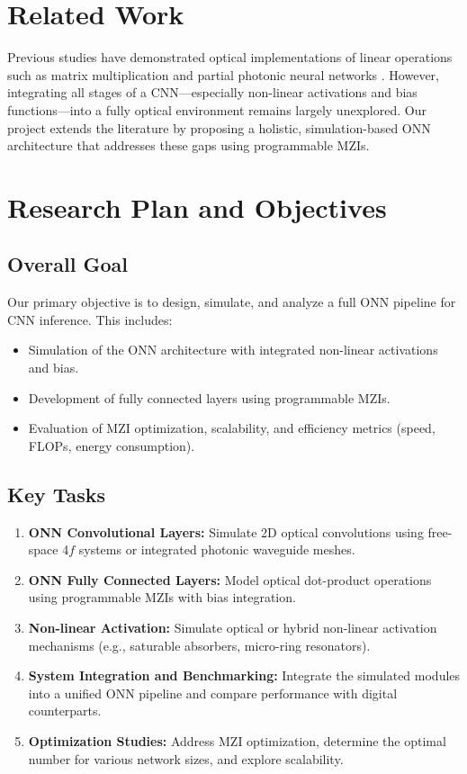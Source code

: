 \documentclass[conference]{IEEEtran}
\begin{document}
\section{Related Work}
Previous studies have demonstrated optical implementations of linear operations such as matrix multiplication \cite{ref:shen2017deep, ref:harris2018linear} and partial photonic neural networks \cite{ref:recent_developments}. However, integrating all stages of a CNN—especially non-linear activations and bias functions—into a fully optical environment remains largely unexplored. Our project extends the literature by proposing a holistic, simulation-based ONN architecture that addresses these gaps using programmable MZIs.

\section{Research Plan and Objectives}
\subsection{Overall Goal}
Our primary objective is to design, simulate, and analyze a full ONN pipeline for CNN inference. This includes:
\begin{itemize}
    \item Simulation of the ONN architecture with integrated non-linear activations and bias.
    \item Development of fully connected layers using programmable MZIs.
    \item Evaluation of MZI optimization, scalability, and efficiency metrics (speed, FLOPs, energy consumption).
\end{itemize}

\subsection{Key Tasks}
\begin{enumerate}
    \item \textbf{ONN Convolutional Layers:} Simulate 2D optical convolutions using free-space 4\(f\) systems or integrated photonic waveguide meshes.
    \item \textbf{ONN Fully Connected Layers:} Model optical dot-product operations using programmable MZIs with bias integration.
    \item \textbf{Non-linear Activation:} Simulate optical or hybrid non-linear activation mechanisms (e.g., saturable absorbers, micro-ring resonators).
    \item \textbf{System Integration and Benchmarking:} Integrate the simulated modules into a unified ONN pipeline and compare performance with digital counterparts.
    \item \textbf{Optimization Studies:} Address MZI optimization, determine the optimal number for various network sizes, and explore scalability.
\end{enumerate}
\end{document}
